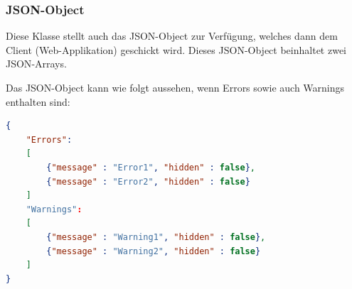 \subsubsection{JSON-Object} \label{subsubsec:Array}
Diese Klasse stellt auch das \ac{JSON}-Object zur Verfügung, welches dann dem Client (Web-Applikation) geschickt wird. Dieses \ac{JSON}-Object beinhaltet zwei \ac{JSON}-Arrays.

Das \ac{JSON}-Object kann wie folgt aussehen, wenn Errors sowie auch Warnings enthalten sind:

\begin{lstlisting}[language=json,firstnumber=1, caption=\ac{JSON}-Object mit Errors und Warnings]
{ 
	"Errors": 
	[ 
		{"message" : "Error1", "hidden" : false}, 
		{"message" : "Error2", "hidden" : false} 
	] 
	"Warnings": 
	[ 
		{"message" : "Warning1", "hidden" : false}, 
		{"message" : "Warning2", "hidden" : false} 
	] 
} 
\end{lstlisting}

